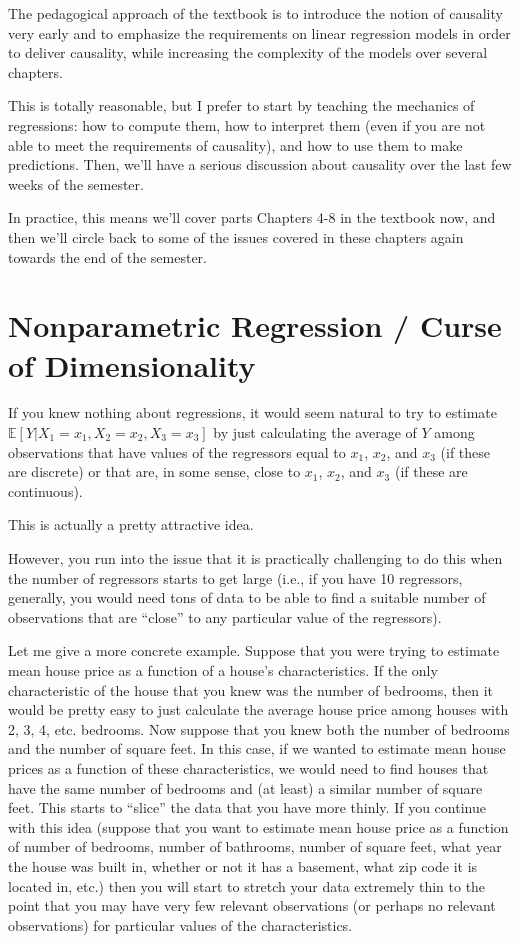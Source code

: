 \documentclass[
  letterpaper,
  DIV=11,
  numbers=noendperiod]{scrreprt}
\begin{document}
The pedagogical approach of the textbook is to introduce the notion of
causality very early and to emphasize the requirements on linear
regression models in order to deliver causality, while increasing the
complexity of the models over several chapters.

This is totally reasonable, but I prefer to start by teaching the
mechanics of regressions: how to compute them, how to interpret them
(even if you are not able to meet the requirements of causality), and
how to use them to make predictions. Then, we'll have a serious
discussion about causality over the last few weeks of the semester.

In practice, this means we'll cover parts Chapters 4-8 in the textbook
now, and then we'll circle back to some of the issues covered in these
chapters again towards the end of the semester.

\section{Nonparametric Regression / Curse of
Dimensionality}\label{nonparametric-regression-curse-of-dimensionality}

If you knew nothing about regressions, it would seem natural to try to
estimate \(\mathbb{E}[Y|X_1=x_1,X_2=x_2,X_3=x_3]\) by just calculating
the average of \(Y\) among observations that have values of the
regressors equal to \(x_1\), \(x_2\), and \(x_3\) (if these are
discrete) or that are, in some sense, close to \(x_1\), \(x_2\), and
\(x_3\) (if these are continuous).

This is actually a pretty attractive idea.

However, you run into the issue that it is practically challenging to do
this when the number of regressors starts to get large (i.e., if you
have 10 regressors, generally, you would need tons of data to be able to
find a suitable number of observations that are ``close'' to any
particular value of the regressors).

Let me give a more concrete example. Suppose that you were trying to
estimate mean house price as a function of a house's characteristics. If
the only characteristic of the house that you knew was the number of
bedrooms, then it would be pretty easy to just calculate the average
house price among houses with 2, 3, 4, etc. bedrooms. Now suppose that
you knew both the number of bedrooms and the number of square feet. In
this case, if we wanted to estimate mean house prices as a function of
these characteristics, we would need to find houses that have the same
number of bedrooms and (at least) a similar number of square feet. This
starts to ``slice'' the data that you have more thinly. If you continue
with this idea (suppose that you want to estimate mean house price as a
function of number of bedrooms, number of bathrooms, number of square
feet, what year the house was built in, whether or not it has a
basement, what zip code it is located in, etc.) then you will start to
stretch your data extremely thin to the point that you may have very few
relevant observations (or perhaps no relevant observations) for
particular values of the characteristics.
\end{document}
